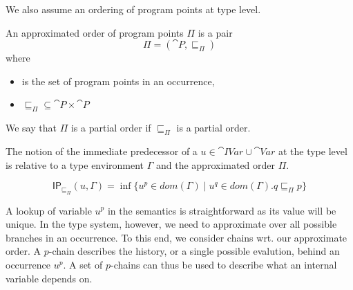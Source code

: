 \documentclass{llncs}
\newcommand{\sqleq}{\ensuremath{\sqsubseteq\xspace}}
\newcommand{\IP}{\ensuremath{\textsf{IP}}\xspace}
\begin{document}
We also assume an ordering of program points at type level.

\begin{definition}
	An approximated order of program points $\Pi$ is a pair
	\[ \Pi=(\cat{P},\sqleq_\Pi) \]
	where
	\begin{itemize}
		\item {} is the set of program points in an occurrence,
		\item $\sqleq_\Pi\subseteq\cat{P}\times\cat{P}$
	\end{itemize}
	We say that $\Pi$ is a partial order if $\sqleq_\Pi$ is a partial order.
\end{definition}

The notion of the immediate predecessor of a $u\in\cat{IVar} \cup \cat{Var}$ at the type level is relative to a type environment $\Gamma$ and the approximated order $\Pi$.

\begin{definition}\label{def:GBindPi}
	\[ \IP_{\sqleq_\Pi}(u,\Gamma)=\inf\{u^p\in
          dom(\Gamma)\mid u^q\in dom(\Gamma).q\sqleq_\Pi p\} \]
\end{definition}

A lookup of variable $u^p$ in the semantics is straightforward as its
value will be unique. In the type system, however, we need to
approximate over all possible branches in an occurrence.  To this end,
we consider chains wrt. our approximate order. A $p$-chain describes
the history, or a single possible evalution, behind an occurrence $u^p$.
A set of $p$-chains can thus be used to describe what an internal variable depends on.



\end{document}
